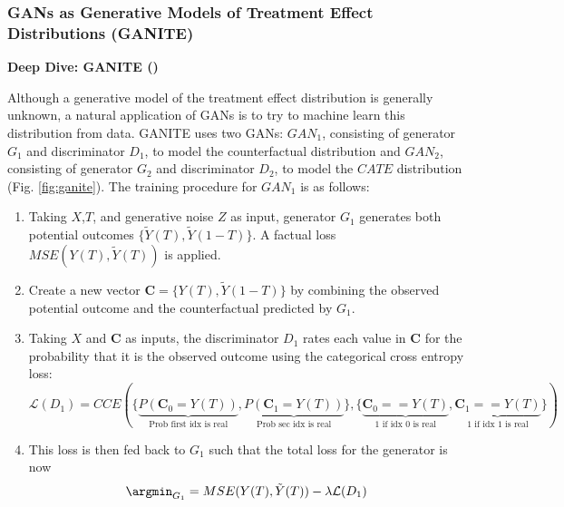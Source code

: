 \subsubsection{GANs as Generative Models of Treatment Effect Distributions (GANITE)}
\textbf{Deep Dive: GANITE (\citep{Yoon2018})}

Although a generative model of the treatment effect distribution is generally unknown, a natural application of GANs is to try to machine learn this distribution from data. GANITE uses two GANs: $GAN_1$, consisting of generator $G_1$ and discriminator $D_1$, to model the counterfactual distribution and $GAN_2$, consisting of generator $G_2$ and discriminator $D_2$, to model the $CATE$ distribution \citep{Yoon2018} (Fig. \ref{fig:ganite}).
The training procedure for $GAN_1$ is as follows:
\begin{enumerate}
\singlespacing
    \item Taking $X$,$T$, and generative noise $Z$ as input, generator $G_1$ generates both potential outcomes $\{\tilde{Y}(T),\tilde{Y}(1-T)\}$. A factual loss $MSE(Y(T),\tilde{Y}(T))$ is applied.
    \item Create a new vector $\textbf{C}=\{Y(T),\tilde{Y}(1-T)\}$ by combining the observed potential outcome and the counterfactual predicted by $G_1$.
    \item Taking $X$ and $\textbf{C}$ as inputs, the discriminator $D_1$ rates each value in $\textbf{C}$ for the probability that it is the observed outcome using the categorical cross entropy loss:
    \begin{equation}
    \mathcal{L}(D_1)=CCE(\{\underbrace{P(\textbf{C}_0=Y(T))}_{\text{Prob first idx is real}},\underbrace{P(\textbf{C}_1=Y(T))}_{\text{Prob sec idx is real}}\},\{\underbrace{\textbf{C}_0==Y(T)}_{\text{1 if idx 0 is real}},\underbrace{\textbf{C}_1==Y(T)}_{\text{1 if idx 1 is real}}\})
\end{equation}
    \item This loss is then fed back to $G_1$ such that the total loss for the generator is now  
    \begin{equation}
        \argmin_{G_1}=MSE(Y(T),\tilde{Y}(T)) - \lambda \mathcal{L}(D_1)
    \end{equation}
\end{enumerate}

